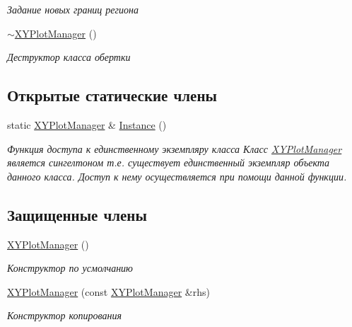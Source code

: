 \begin{DoxyCompactItemize}
\begin{DoxyCompactList}\small\item\em Задание новых границ региона \end{DoxyCompactList}\item 
\hyperlink{classxyplot_1_1_x_y_plot_manager_a402bc06e3eb7f165e3c1415d691df3b3}{$\sim$\-X\-Y\-Plot\-Manager} ()
\begin{DoxyCompactList}\small\item\em Деструктор класса обертки \end{DoxyCompactList}\end{DoxyCompactItemize}
\subsection*{Открытые статические члены}
\begin{DoxyCompactItemize}
\item 
static \hyperlink{classxyplot_1_1_x_y_plot_manager}{X\-Y\-Plot\-Manager} \& \hyperlink{classxyplot_1_1_x_y_plot_manager_abfde221555f11c692969986174781780}{Instance} ()
\begin{DoxyCompactList}\small\item\em Функция доступа к единственному экземпляру класса Класс \hyperlink{classxyplot_1_1_x_y_plot_manager}{X\-Y\-Plot\-Manager} является сингелтоном т.\-е. существует единственный экземпляр объекта данного класса. Доступ к нему осуществляется при помощи данной функции. \end{DoxyCompactList}\end{DoxyCompactItemize}
\subsection*{Защищенные члены}
\begin{DoxyCompactItemize}
\item 
\hyperlink{group__gr_construct_gafc0df2010690907aa3a1503ebb90345c}{X\-Y\-Plot\-Manager} ()
\begin{DoxyCompactList}\small\item\em Конструктор по усмолчанию \end{DoxyCompactList}\item 
\hyperlink{group__gr_construct_ga3eea4a6ab361a23f4fa7e7aa69758cd0}{X\-Y\-Plot\-Manager} (const \hyperlink{classxyplot_1_1_x_y_plot_manager}{X\-Y\-Plot\-Manager} \&rhs)
\begin{DoxyCompactList}\small\item\em Конструктор копирования \end{DoxyCompactList}\end{DoxyCompactItemize}
